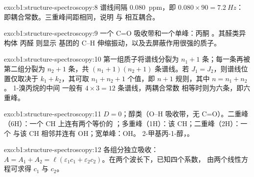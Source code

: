 \begin{solution}{exo:b1:structure-spectroscopy:8}
谱线间隔 \qty{0.080}{ppm}，即 $0.080 \times 90 = \qty{7.2}{Hz}$：
即耦合常数。三重峰间距相同，说明  与
 相互耦合。
\end{solution}

\begin{solution}{exo:b1:structure-spectroscopy:9}
一个 C=O 吸收带和一个单峰：丙酮 。其醛类异构体
丙醛  则显示
 基团的 C--H 伸缩振动，以及去屏蔽作用很强的质子。
\end{solution}

\begin{solution}{exo:b1:structure-spectroscopy:10}
第一组质子将谱线分裂为 $n_1 + 1$ 条；每一条再被第二组分裂为
$n_2 + 1$ 条，共 $(n_1 + 1)(n_2 + 1)$ 条谱线。若 $J_1 =
J_2$，则谱线位置仅取决于 $k_1 + k_2$，其可取 $n_1 + n_2 +
1$ 个值，即 $n + 1$ 规则，其中 $n = n_1 + n_2$。
1-溴丙烷的中间  一般有 $4 \times 3 = 12$ 条谱线，两耦合常数
相等时则为六条，即六重峰。
\end{solution}

\begin{solution}{exo:b1:structure-spectroscopy:11}
$D = 0$；醇类（O--H 吸收带，无 C=O）。二重峰（6H）：一个 CH 上连有两个等价的
；多重峰（1H）：该 CH；二重峰（2H）：一个 
与该 CH 相邻并连有 OH；宽单峰：OH。
2-甲基丙-1-醇，。
\end{solution}

\begin{solution}{exo:b1:structure-spectroscopy:12}
各组分独立吸收：$A = A_1 + A_2 = \ell(\varepsilon_1c_1
+ \varepsilon_2c_2)$。在两个波长下，已知四个系数，
由两个线性方程可求得 $c_1$ 与 $c_2$。
\end{solution}

